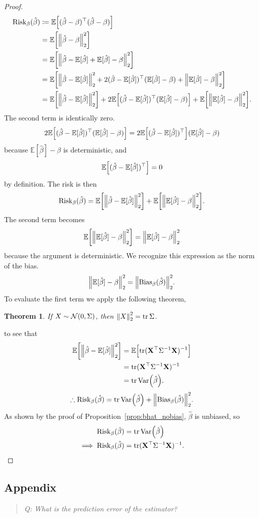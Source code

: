 \documentclass[letterpaper, reqno]{amsart}
\newtheorem{theorem}{Theorem}[section]
\numberwithin{equation}{section}
\DeclarePairedDelimiter{\norm}{\lVert}{\rVert}
\newcommand{\T}{\top} %
\newcommand{\vect}[1]{\boldsymbol{\mathbf{#1}}} %
\newcommand{\E}[1]{\mathbb{E}\mleft[#1\mright]}
\newcommand{\Var}[1]{\operatorname{Var}\mleft(#1\mright)}
\newcommand{\N}[2]{\mathcal{N}\mleft( #1, #2 \mright)}
\newcommand{\Xm}{\vect{X}}
\newcommand{\Bv}{\beta}
\newcommand{\Bvh}{\hat{\beta}}
\newcommand{\Ebh}{\mathbb{E}[\Bvh]}
\DeclareMathOperator{\tr}{tr}
\begin{document}
\begin{proof}
  \begin{alignat*}{3}
    \mathrm{Risk}_\Bv(\Bvh) &\coloneqq \E{(\Bvh - \Bv)^\T(\Bvh - \Bv)} \\
    &= \E{\norm*{\Bvh - \Bv}_2^2} \\
    &= \E{\norm*{\Bvh - \Ebh + \Ebh - \Bv}_2^2} \\
    &= \E{\norm*{\Bvh - \Ebh}_2^2 
      + 2(\Bvh - \Ebh)^\T (\Ebh - \Bv)
      + \norm*{\Ebh - \Bv}_2^2} \\
    &= \E{\norm*{\Bvh - \Ebh}_2^2}
      + 2\E{(\Bvh - \Ebh)^\T (\Ebh - \Bv)} 
      + \E{\norm*{\Ebh - \Bv}_2^2}.
  \end{alignat*}
  The second term is identically zero.
  \[ 2\E{(\Bvh - \Ebh)^\T (\Ebh - \Bv)} = 2\E{(\Bvh - \Ebh)^\T}(\Ebh - \Bv) \]
  because $\Ebh - \Bv$ is deterministic, and 
  \[ \E{(\Bvh - \Ebh)^\T} = 0 \]
  by definition. The risk is then
  \[ \mathrm{Risk}_\Bv(\Bvh) = \E{\norm*{\Bvh - \Ebh}_2^2} + \E{\norm*{\Ebh - \Bv}_2^2}. \]
  The second term becomes
  \[ \E{\norm*{\Ebh - \Bv}_2^2} = \norm*{\Ebh - \Bv}_2^2 \]
  because the argument is deterministic. We recognize this expression as the
  norm of the bias.
  \[ \norm*{\Ebh - \Bv}_2^2 = \norm*{\mathrm{Bias}_\Bv(\Bvh)}_2^2. \]
  To evaluate the first term we apply the following theorem,
  \begin{theorem} \label{thm:normnorm}
    If $X \sim \N{0}{\Sigma}$, then $\norm*{X}_2^2 = \tr \Sigma$.
  \end{theorem}
  to see that
  \begin{align}
    \E{\norm*{\Bvh - \Ebh}_2^2} &= \E{\tr (\Xm^\T \Sigma^{-1} \Xm)^{-1}} \\
    &= \tr (\Xm^\T \Sigma^{-1} \Xm)^{-1} \\
    &= \tr \Var{\Bvh}.
  \end{align}
  \[ \therefore \mathrm{Risk}_\Bv(\Bvh) = \tr \Var{\Bvh} + \norm*{\mathrm{Bias}_\Bv(\Bvh)}_2^2. \]
  As shown by the proof of Proposition~\ref{prop:bhat_nobias}, $\Bvh$ is
  unbiased, so
  \begin{align*}
    \mathrm{Risk}_\Bv(\Bvh) &= \tr \Var{\Bvh}  \\
    \implies \mathrm{Risk}_\Bv(\Bvh) &= \tr (\Xm^\T \Sigma^{-1} \Xm)^{-1}.
    \qedhere
  \end{align*}
\end{proof}

\subsection*{Appendix}
\begin{quote}
  \emph{Q: What is the prediction error of the estimator?}
\end{quote}
\end{document}

